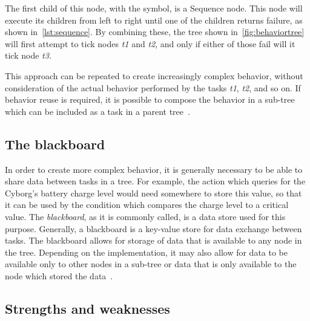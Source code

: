 \documentclass[\rootfolder/main.tex]{subfiles}
\begin{document}
The first child of this node, with the \emph{\rightarrow} symbol, is a Sequence node.
This node will execute its children from left to right until one of the children returns failure, as shown in~\cref{lst:sequence}.
By combining these, the tree shown in~\cref{fig:behaviortree} will first attempt to tick nodes \emph{t1} and \emph{t2}, and only if either of those fail will it tick node \emph{t3}.

This approach can be repeated to create increasingly complex behavior, without consideration of the actual behavior performed by the tasks \emph{t1}, \emph{t2}, and so on.
If behavior reuse is required, it is possible to compose the behavior in a sub-tree which can be included as a task in a parent tree~\cite{Millington2009}.


\subsection{The blackboard}

In order to create more complex behavior, it is generally necessary to be able to share data between tasks in a tree.
For example, the action which queries for the Cyborg's battery charge level would need somewhere to store this value, so that it can be used by the condition which compares the charge level to a critical value.
The \emph{blackboard}, as it is commonly called, is a data store used for this purpose.
Generally, a blackboard is a key-value store for data exchange between tasks.
The blackboard allows for storage of data that is available to any node in the tree.
Depending on the implementation, it may also allow for data to be available only to other nodes in a sub-tree or data that is only available to the node which stored the data~\cite{Millington2009}.


\subsection{Strengths and weaknesses}
\end{document}
